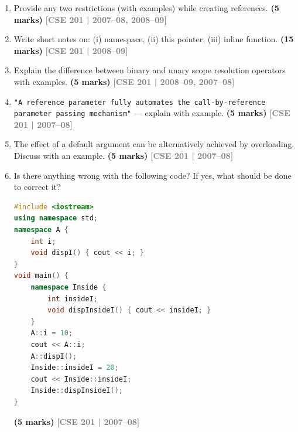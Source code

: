 \documentclass[12pt,a3paper]{article}
\newcommand{\yr}[1]{\hfill\textcolor{gray}{\small\textbf{[#1]}}}
\newcommand{\mk}[1]{\textcolor{orange!70!black}{\small\textbf{(#1 marks)}}}
\begin{document}
\begin{enumerate}




\item Provide any two restrictions (with examples) while creating references. \mk{5}
\yr{CSE 201 | 2007--08, 2008--09}




\item Write short notes on: (i) namespace, (ii) this pointer, (iii) inline function. \mk{15}
\yr{CSE 201 | 2008--09}




\item Explain the difference between binary and unary scope resolution operators with examples. \mk{5}
\yr{CSE 201 | 2008--09, 2007--08}






\item \texttt{"A reference parameter fully automates the call-by-reference parameter passing mechanism"} --- explain with example. \mk{5}
\yr{CSE 201 | 2007--08}




\item The effect of a default argument can be alternatively achieved by overloading. Discuss with an example. \mk{5}
\yr{CSE 201 | 2007--08}






\item Is there anything wrong with the following code? If yes, what should be done to correct it?
\begin{lstlisting}[language=C++]
#include <iostream>
using namespace std;
namespace A {
    int i;
    void dispI() { cout << i; }
}
void main() {
    namespace Inside {
        int insideI;
        void dispInsideI() { cout << insideI; }
    }
    A::i = 10;
    cout << A::i;
    A::dispI();
    Inside::insideI = 20;
    cout << Inside::insideI;
    Inside::dispInsideI();
}
\end{lstlisting}
\mk{5}
\yr{CSE 201 | 2007--08}


\end{enumerate}
\end{document}
